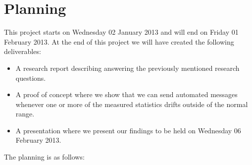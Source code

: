 \documentclass{article}
\begin{document}
\section{Planning}
This project starts on Wednesday 02 January 2013 and will end on Friday 01 February 2013. 
At the end of this project we will have created the following deliverables:
\begin{itemize}
\item A research report describing answering the previously mentioned research questions.
\item A proof of concept where we show that we can send automated messages whenever one or more of the measured statistics drifts outside of the normal range.
\item A presentation where we present our findings to be held on Wednesday 06 February 2013.
\end{itemize}

The planning is as follows:\\
  \begin{gantt}[xunitlength=50pt]{9}{5}
    \begin{ganttitle}
    \end{ganttitle}
    \begin{ganttitle}
    \end{ganttitle}
  \end{gantt}
  




\end{document}
